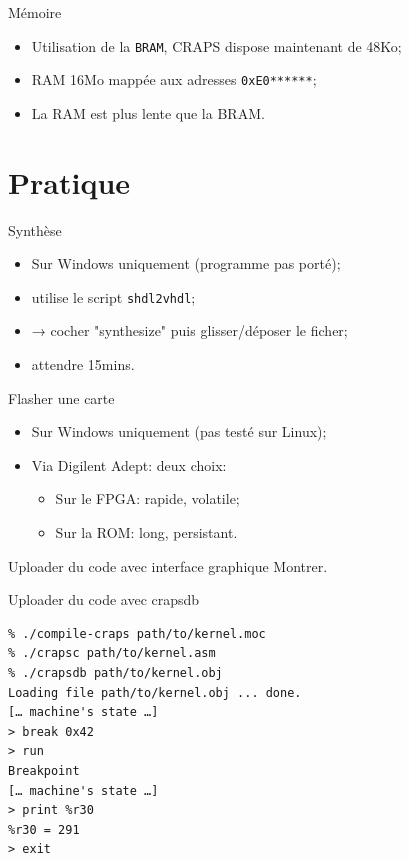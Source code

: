 \documentclass{beamer}
\begin{document}
    \begin{frame}[fragile]{Mémoire}
      \begin{itemize}
        \item Utilisation de la \verb+BRAM+, CRAPS dispose maintenant de 48Ko;
        \item RAM 16Mo mappée aux adresses \verb+0xE0******+;
        \item La RAM est plus lente que la BRAM.
      \end{itemize}
\end{frame}

  \section{Pratique}
    \begin{frame}[fragile]{Synthèse}
      \begin{itemize}
        \item Sur Windows uniquement (programme pas porté);
        \item utilise le script \verb+shdl2vhdl+;
        \item → cocher "synthesize" puis glisser/déposer le ficher;
        \item attendre 15mins.
      \end{itemize}
\end{frame}

    \begin{frame}{Flasher une carte}
      \begin{itemize}
        \item Sur Windows uniquement (pas testé sur Linux);
        \item Via Digilent Adept: deux choix:
          \begin{itemize}
            \item Sur le FPGA: rapide, volatile;
            \item Sur la ROM: long, persistant.
          \end{itemize}
      \end{itemize}
    \end{frame}

    \begin{frame}{Uploader du code avec interface graphique}
      Montrer.
    \end{frame}

    \begin{frame}[fragile]{Uploader du code avec crapsdb}
      \begin{verbatim}
% ./compile-craps path/to/kernel.moc
% ./crapsc path/to/kernel.asm
% ./crapsdb path/to/kernel.obj
Loading file path/to/kernel.obj ... done.
[… machine's state …]
> break 0x42
> run
Breakpoint
[… machine's state …]
> print %r30
%r30 = 291
> exit
      \end{verbatim}
\end{frame}
\end{document}
